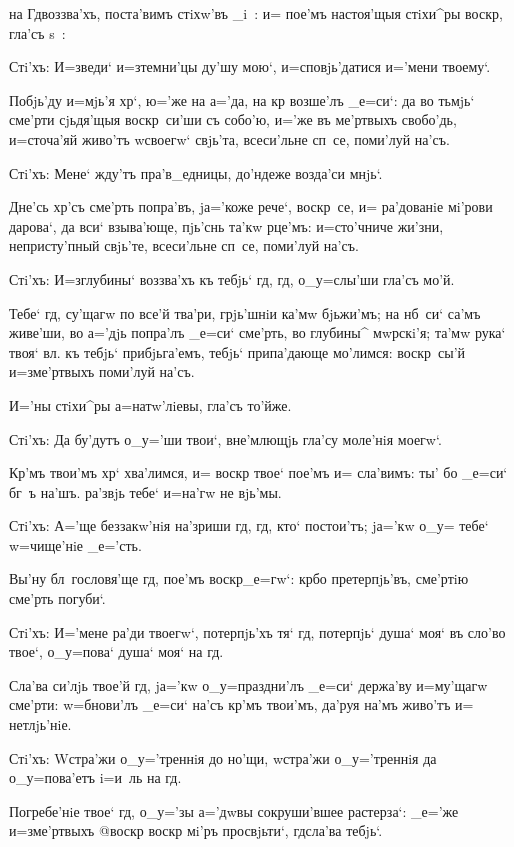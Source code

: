 
на Гд воззва'хъ, поста'вимъ стiхw'въ _i~: и= пое'мъ 
настоя'щыя стiхи^ры воскр, гла'съ s~:

Стi'хъ: И=зведи` и=з\ъ темни'цы ду'шу мою`, 
и=сповjь'датися и='мени твоему`.

Побjь'ду и=мjь'я хр`, ю='же на а='да, на кр 
возше'лъ _е=си`: да во тьмjь` сме'рти сjьдя'щыя 
воскр~си'ши съ собо'ю, и='же въ ме'ртвыхъ свобо'дь, 
и=сточа'яй живо'тъ w\т своегw` свjь'та, всеси'льне сп~се, 
поми'луй на'съ.

Стi'хъ: Мене` жду'тъ пра'в_едницы, до'ндеже возда'си 
мнjь`. 

Дне'сь хр'съ сме'рть попра'въ, jа='коже рече`, 
воскр~се, и= ра'дованiе мi'рови дарова`, да вси` 
взыва'юще, пjь'снь та'кw рце'мъ: и=сто'чниче жи'зни, 
непристу'пный свjь'те, всеси'льне сп~се, поми'луй на'съ. 

Стi'хъ: И=з\ъ глубины` воззва'хъ къ тебjь` гд, 
гд, о_у=слы'ши гла'съ мо'й.

Тебе` гд, су'щагw по все'й тва'ри, грjь'шнiи ка'мw 
бjьжи'мъ; на нб~си` са'мъ живе'ши, во а='дjь попра'лъ 
_е=си` сме'рть, во глубины^ мwрскi'я; та'мw рука` твоя` 
вл. къ тебjь` прибjьга'емъ, тебjь` припа'дающе 
мо'лимся: воскр~сы'й и=з\ъ ме'ртвыхъ поми'луй на'съ. 

И='ны стiхи^ры а=натw'лiевы, гла'съ то'йже.

Стi'хъ: Да бу'дутъ о_у='ши твои`, вне'млющjь гла'су 
моле'нiя моегw`. 

Кр'мъ твои'мъ хр` хва'лимся, и= воскр 
твое` пое'мъ и= сла'вимъ: ты' бо _е=си` бг~ъ на'шъ. 
ра'звjь тебе` и=на'гw не вjь'мы.

Стi'хъ: А='ще беззакw'нiя на'зриши гд, гд, кто` 
постои'тъ; jа='кw о_у= тебе` w=чище'нiе _е='сть.

Вы'ну бл~гословя'ще гд, пое'мъ воскр _е=гw`: 
кр бо претерпjь'въ, сме'ртiю сме'рть погуби`.

Стi'хъ: И='мене ра'ди твоегw`, потерпjь'хъ тя` гд, 
потерпjь` душа` моя` въ сло'во твое`, о_у=пова` душа` 
моя` на гд.

Сла'ва си'лjь твое'й гд, jа='кw о_у=праздни'лъ 
_е=си` держа'ву и=му'щагw сме'рти: w=бнови'лъ _е=си` 
на'съ кр'мъ твои'мъ, да'руя на'мъ живо'тъ и= 
нетлjь'нiе.

Стi'хъ: W\т стра'жи о_у='треннiя до но'щи, w\т стра'жи 
о_у='треннiя да о_у=пова'етъ i=и~ль на гд.

Погребе'нiе твое` гд, о_у='зы а='дwвы сокруши'вшее 
растерза`: _е='же и=з\ъ ме'ртвыхъ @воскр 
{воскр} мi'ръ просвjьти`, гд сла'ва тебjь`.

